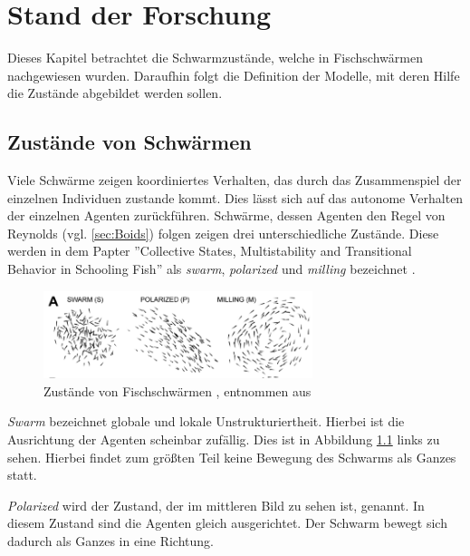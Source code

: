 
\chapter{Stand der Forschung}\label{chap:forschung}

Dieses Kapitel betrachtet die Schwarmzustände, welche in Fischschwärmen nachgewiesen wurden.
Daraufhin folgt die Definition der Modelle, mit deren Hilfe die Zustände abgebildet werden sollen.

\section{Zustände von Schwärmen}\label{sec:Zustaende}

Viele Schwärme zeigen koordiniertes Verhalten, das durch das Zusammenspiel der einzelnen Individuen zustande kommt. Dies lässt sich auf das autonome Verhalten der einzelnen Agenten zurückführen. Schwärme, dessen Agenten den Regel von Reynolds (vgl. \ref{sec:Boids}) folgen zeigen drei unterschiedliche Zustände. Diese werden in dem Papter ''Collective States, Multistability and Transitional Behavior in Schooling Fish'' als \textit{swarm}, \textit{polarized} und \textit{milling} bezeichnet \cite{Tunstrm2013CollectiveSM} .

\begin{figure}[h]
\centering

\includegraphics[width=0.7\textwidth]{figures/Forschung/states.png} 

\caption{Zustände von Fischschwärmen \label{fig:Zustaende}, entnommen aus \citep{Tunstrm2013CollectiveSM}}
\end{figure}

\textit{Swarm} bezeichnet globale und lokale Unstrukturiertheit. Hierbei ist die Ausrichtung der Agenten scheinbar zufällig. Dies ist in Abbildung \ref{fig:Zustaende} links zu sehen. Hierbei findet zum größten Teil keine Bewegung des Schwarms als Ganzes statt.

\textit{Polarized} wird der Zustand, der im mittleren Bild zu sehen ist, genannt.
In diesem Zustand sind die Agenten gleich ausgerichtet. Der Schwarm bewegt sich dadurch als Ganzes in eine Richtung.

